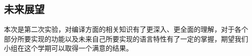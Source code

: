 \documentclass[UTF8,a4paper,10pt]{ctexart}
\begin{document}
\subsection{未来展望}
本次是第二次实验，对编译方面的相关知识有了更深入、更全面的理解，对于各个部分所要实现的功能以及未来自己所要实现的语言特性有了一定的掌握，期望我们小组在这个学期可以取得一个满意的结果。
% 
%  
\newpage

 
\end{document}
